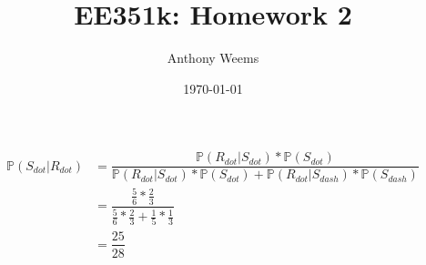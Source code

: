 \documentclass{article}
\begin{document}
\title{EE351k: Homework 2}
\author{Anthony Weems}
\date{\today}
\maketitle

\subsection{}

\begin{align*}
    \mathbb{P}(S_{dot}|R_{dot}) &= \dfrac{\mathbb{P}(R_{dot}|S_{dot}) * \mathbb{P}(S_{dot})}{\mathbb{P}(R_{dot}|S_{dot}) * \mathbb{P}(S_{dot}) + \mathbb{P}(R_{dot}|S_{dash}) * \mathbb{P}(S_{dash})} \\
    &=\dfrac{\frac{5}{6} * \frac{2}{3}}{\frac{5}{6} * \frac{2}{3} + \frac{1}{5} * \frac{1}{3}} \\
    &=\dfrac{25}{28}
\end{align*}

\subsection{}
\end{document}
